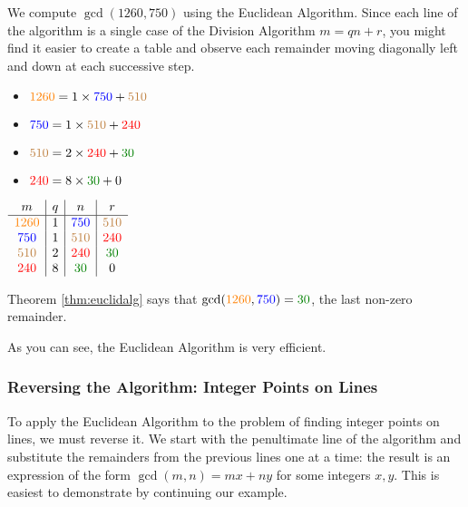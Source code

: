 \begin{example}{}{}
We compute $\gcd(1260,750)$ using the Euclidean Algorithm. Since each line of the algorithm is a single case of the Division Algorithm $m=qn+r$, you might find it easier to create a table and observe each remainder moving diagonally left and down at each successive step.

\begin{minipage}{0.5\textwidth}
\vspace*{10pt}
\begin{itemize}\setlength{\itemsep}{0pt}
  \item[]$\textcolor{orange}{1260}=1\times \textcolor{blue}{750}+\textcolor{brown}{510}$
  \item[]$\textcolor{blue}{750}=1\times \textcolor{brown}{510}+\textcolor{red}{240}$
  \item[]$\textcolor{brown}{510}=2\times \textcolor{red}{240}+\textcolor{Green}{30}$
  \item[]$\textcolor{red}{240}=8\times \textcolor{Green}{30}+0$
\end{itemize}
\end{minipage}
\begin{minipage}{0.5\textwidth}
\renewcommand{\arraystretch}{1.35}
$\begin{array}{c|c|c|c}
m&q&n&r\\\hline
\textcolor{orange}{1260}&1&\textcolor{blue}{750}&\textcolor{brown}{510}\\
\textcolor{blue}{750}&1&\textcolor{brown}{510}&\textcolor{red}{240}\\
\textcolor{brown}{510}&2&\textcolor{red}{240}&\textcolor{Green}{30}\\
\textcolor{red}{240}&8&\textcolor{Green}{30}&0
\end{array}$
\end{minipage}
Theorem \ref{thm:euclidalg} says that $\gcd(\textcolor{orange}{1260},\textcolor{blue}{750})=\textcolor{Green}{30}$, the last non-zero remainder.
\end{example}

 As you can see, the Euclidean Algorithm is very efficient.

\subsubsection*{Reversing the Algorithm: Integer Points on Lines}

To apply the Euclidean Algorithm to the problem of finding integer points on lines, we must reverse it. We start with the penultimate line of the algorithm and substitute the remainders from the previous lines one at a time: the result is an expression of the form $\gcd(m,n)=mx+ny$ for some integers $x,y$. This is easiest to demonstrate by continuing our example.

